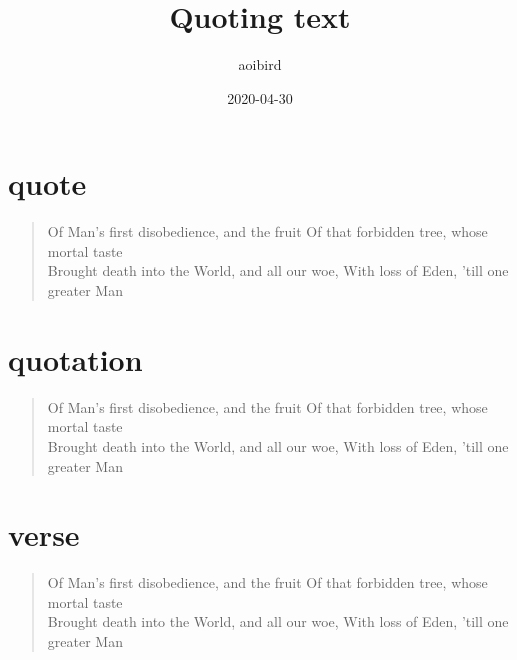 \documentclass{article}
\title{Quoting text}
\author{aoibird}
\date{2020-04-30}
\begin{document}
\maketitle

\section{quote}
\begin{quote}
    Of Man's first disobedience, and the fruit
    Of that forbidden tree, whose mortal taste\\
    Brought death into the World, and all our woe,
    With loss of Eden, 'till one greater Man
\end{quote}

\section{quotation}
\begin{quotation}
    Of Man's first disobedience, and the fruit
    Of that forbidden tree, whose mortal taste\\
    Brought death into the World, and all our woe,
    With loss of Eden, 'till one greater Man
\end{quotation}

\section{verse}
\begin{verse}
    Of Man's first disobedience, and the fruit
    Of that forbidden tree, whose mortal taste\\
    Brought death into the World, and all our woe,
    With loss of Eden, 'till one greater Man
\end{verse}
\end{document}
